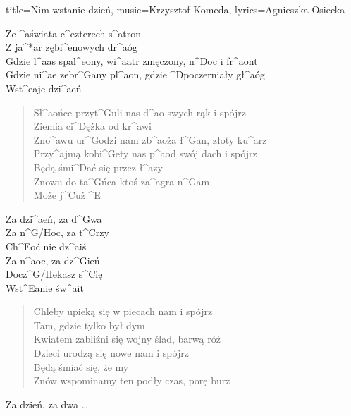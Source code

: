 \newpage
\normalsize
\begin{song}{title={Nim wstanie dzień}, music={Krzysztof Komeda}, lyrics={Agnieszka Osiecka}}
\begin{multicols}{2}
	\begin{intro}
		Ze ^{a}świata c^{e}zterech s^{a}tron \\
		Z ja^*{a}r zębi^{e}nowych dr^{a}óg \\
   		Gdzie l^{a}as spal^{e}ony, wi^{a}atr zmęczony, n^{D}oc i fr^{a}ont \\
   		Gdzie ni^{a}e zebr^{G}any pl^{a}on, gdzie ^{D}poczerniały gł^{a}óg \\
   		Wst^{e}aje dzi^{a}eń
	\end{intro}
	\begin{verse}
		Sł^{a}ońce przyt^{G}uli nas d^{a}o swych rąk i spójrz \\ 
		Ziemia ci^{D}ężka od kr^{a}wi \\
		Zno^{a}wu ur^{G}odzi nam zb^{a}oża ł^{G}an, złoty ku^{a}rz \\
		Przy^{a}jmą kobi^{G}ety nas p^{a}od swój dach i spójrz \\
		Będą śmi^{D}ać się przez ł^{a}zy \\
		Znowu do ta^{G}ńca ktoś za^{a}gra n^{G}am  \\
		Może j^{C}uż ^{E} 
	\end{verse}
	\begin{chorus}
		Za dzi^{a}eń, za d^{G}wa \\
		Za n^{G/H}oc, za t^{C}rzy \\
		Ch^{E}oć nie dz^{a}iś \\
		Za n^{a}oc, za dz^{G}ień \\
		Docz^{G/H}ekasz s^{C}ię \\
		Wst^{E}anie św^{a}it
	\end{chorus}
	\begin{verse}
		Chleby upieką się w piecach nam i spójrz  \\
		Tam, gdzie tylko był dym \\
		Kwiatem zabliźni się wojny ślad, barwą róż \\
		Dzieci urodzą się nowe nam i spójrz  \\
		Będą śmiać się, że my  \\
		Znów wspominamy ten podły czas, porę burz \\
	\end{verse}
	\begin{chorus}
		Za dzień, za dwa \ldots
	\end{chorus}
\end{multicols}
\end{song}


